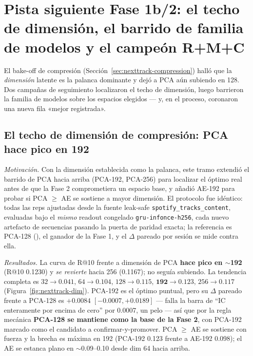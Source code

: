 \documentclass[11pt]{article}
\newcommand{\runid}[1]{\texttt{\small\seqsplit{#1}}}
\newcommand{\dsid}[1]{\texttt{\small #1}}
\begin{document}
\section{Pista siguiente Fase 1b/2: el techo de dimensión, el barrido de familia de modelos y el campeón R+M+C}
\label{sec:nexttrack-phase2}
El bake-off de compresión (Sección~\ref{sec:nexttrack-compression}) halló que la
\emph{dimensión} latente es la palanca dominante y dejó a PCA aún subiendo en 128.
Dos campañas de seguimiento localizaron el techo de dimensión, luego barrieron la
familia de modelos sobre los espacios elegidos --- y, en el proceso, coronaron una
nueva fila «mejor registrada».

\subsection{El techo de dimensión de compresión: PCA hace pico en 192}
\label{sec:nexttrack-dim}
\emph{Motivación.} Con la dimensión establecida como la palanca, este tramo extendió
el barrido de PCA hacia arriba (PCA-192, PCA-256) para localizar el óptimo real
antes de que la Fase 2 comprometiera un espacio base, y añadió AE-192 para probar si
PCA $\ge$ AE se sostiene a mayor dimensión. El protocolo fue idéntico: todas las
reps ajustadas desde la fuente leak-safe \dsid{spotify\_tracks\_content}, evaluadas
bajo el \emph{mismo} readout congelado \texttt{gru-infonce-h256}, cada nuevo
artefacto de secuencias pasando la puerta de paridad exacta; la referencia es
PCA-128 (\runid{run-20260715-042100-a1d9d}), el ganador de la Fase 1, y el
$\Delta$ pareado por sesión se mide contra ella.

\emph{Resultados.} La curva de R@10 frente a dimensión de PCA \textbf{hace pico en
$\sim$192} (R@10 \num{0.1230}) y \emph{se revierte} hacia 256 (\num{0.1167}); no
seguía subiendo. La tendencia completa es $32\!\to\!\num{0.041}$,
$64\!\to\!\num{0.104}$, $128\!\to\!\num{0.115}$, $\mathbf{192\!\to\!\num{0.123}}$,
$256\!\to\!\num{0.117}$ (Figura~\ref{fig:nexttrack-dim}). PCA-192 es el óptimo
puntual, pero su $\Delta$ pareado frente a PCA-128 es $+\num{0.0084}$ $[-0.0007,
+0.0189]$ --- falla la barra de ``IC enteramente por encima de cero'' por
\num{0.0007}, un pelo --- así que por la regla mecánica \textbf{PCA-128 se mantiene
como la base de la Fase 2}, con PCA-192 marcado como el candidato a
confirmar-y-promover. PCA $\ge$ AE se sostiene con fuerza y la brecha es máxima en
192 (PCA-192 \num{0.123} frente a AE-192 \num{0.098}); el AE se estanca plano en
$\sim$0.09--0.10 desde dim 64 hacia arriba.
\end{document}
